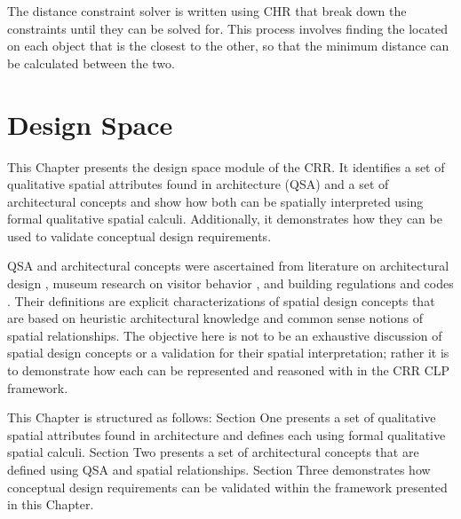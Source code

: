 \documentclass[12pt]{ucthesis}
\begin{document}
The distance constraint solver is written using CHR that break down the constraints until they can be solved for. This process involves finding the located on each object that is the closest to the other, so that the minimum distance can be calculated between the two. 


\chapter{Design Space} \label{conceptual requirements}
This Chapter presents the design space module of the CRR. It identifies a set of qualitative spatial attributes found in architecture (QSA) and a set of architectural concepts and show how both can be spatially interpreted using formal qualitative spatial calculi. Additionally, it demonstrates how they can be used to validate conceptual design requirements. 

QSA and architectural concepts were ascertained from literature on architectural design \cite{tbd}, museum research on visitor behavior \cite{tbd}, and building regulations and codes \cite{tbd}. Their definitions are explicit characterizations of spatial design concepts that are based on heuristic architectural knowledge and common sense notions of spatial relationships. The objective here is not to be an exhaustive discussion of spatial design concepts or a validation for their spatial interpretation; rather it is to demonstrate how each can be represented and reasoned with in the CRR CLP framework. 


This Chapter is structured as follows: Section One presents a set of qualitative spatial attributes found in architecture and defines each using formal qualitative spatial calculi. Section Two presents a set of architectural concepts that are defined using QSA and spatial relationships. Section Three demonstrates how conceptual design requirements can be validated within the framework presented in this Chapter.
\end{document}
